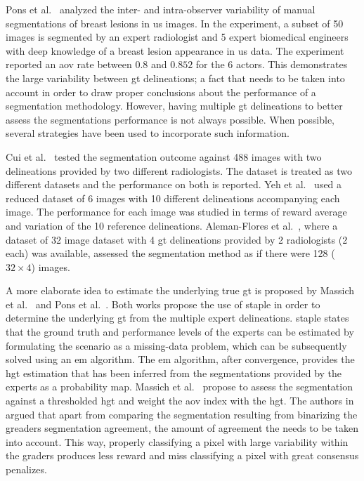\documentclass[authoryear,preprint,review,12pt]{elsarticle}
\begin{document}
Pons et al.~\cite{gerard2013} analyzed the inter- and intra-observer variability of manual segmentations of breast lesions in \ac{us} images. In the experiment, a subset of 50 images is segmented by an expert radiologist and 5 expert biomedical engineers with deep knowledge of a breast lesion appearance in \ac{us} data. The experiment reported an \ac{aov} rate between $0.8$ and $0.852$ for the 6 actors. This demonstrates the large variability between \ac{gt} delineations; a fact that needs to be taken into account in order to draw proper conclusions about the performance of a segmentation methodology. However, having multiple \ac{gt} delineations to better assess the segmentations performance is not always possible. When possible, several strategies have been used to incorporate such information.

Cui et al.~\cite{Cui:2009p14325} tested the segmentation outcome against 488 images with two delineations provided by two different radiologists. The dataset is treated as two different datasets and the performance on both is reported.
Yeh et al.~\cite{Yeh:2009p11985} used a reduced dataset of 6 images with 10 different delineations accompanying each image. The performance for each image was studied in terms of reward average and variation of the 10 reference delineations.
Aleman-Flores et al.~\cite{AlemanFlores:2007p14310}, where a dataset of 32 image dataset with 4 \ac{gt} delineations provided by 2 radiologists (2 each) was available, assessed the segmentation method as if there were 128 ($32 \times 4$) images.

A more elaborate idea to estimate the underlying true \ac{gt} is proposed by Massich et al.~\cite{massich2010lesion} and Pons et al.~\cite{gerard2013}. Both works propose the use of \ac{staple} in order to determine the underlying \ac{gt} from the multiple expert delineations. \ac{staple} states that the ground truth and performance levels of the experts can be estimated by formulating the scenario as a missing-data problem, which can be subsequently solved using an \ac{em} algorithm. The \ac{em} algorithm, after convergence, provides the \acf{hgt} estimation that has been inferred from the segmentations provided by the experts as a probability map. Massich et al.~\cite{massich2010lesion} propose to assess the segmentation against a thresholded \ac{hgt} and weight the \ac{aov} index with the \ac{hgt}. The authors in~\cite{massich2010lesion} argued that apart from comparing the segmentation resulting from binarizing the greaders segmentation agreement, the amount of agreement the needs to be taken into account. This way, properly classifying a pixel with large variability within the graders produces less reward and miss classifying a pixel with great consensus penalizes.
\end{document}
